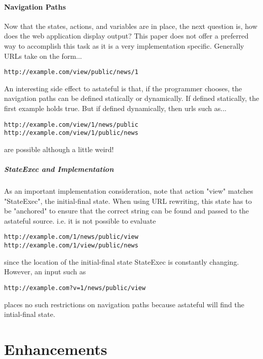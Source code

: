 \documentclass[11pt,twocolumn]{article}
\begin{document}
\subsection{Navigation Paths}
Now that the states, actions, and variables are in place, the next question is, how does the web application display output? This paper does not offer a preferred way to accomplish this task as it is a very implementation specific. Generally URLs take on the form...
\begin{verbatim}
http://example.com/view/public/news/1
\end{verbatim}
An interesting side effect to astateful is that, if the programmer chooses, the navigation paths can be defined statically or dynamically. If defined statically, the first example holds true. But if defined dynamically, then urls such as...

\begin{verbatim}
http://example.com/view/1/news/public
http://example.com/view/1/public/news
\end{verbatim}

are possible although a little weird!

\subsubsection{StateExec and Implementation}
As an important implementation consideration, note that action "view" matches "StateExec", the initial-final state. When using URL rewriting, this state has to be "anchored" to ensure that the correct string can be found and passed to the astateful source. i.e. it is not possible to evaluate 

\begin{verbatim}
http://example.com/1/news/public/view
http://example.com/1/view/public/news
\end{verbatim}

since the location of the initial-final state StateExec is constantly changing. However, an input such as 

\begin{verbatim}
http://example.com?v=1/news/public/view
\end{verbatim}

places no such restrictions on navigation paths because astateful will find the intial-final state.

\newpage
\part{Enhancements}
\end{document}
